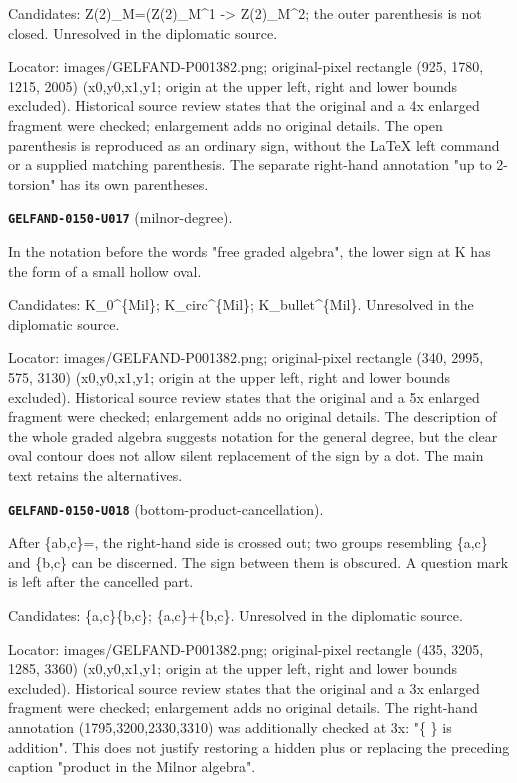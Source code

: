 \documentclass[11pt]{article}
\theoremstyle{definition}
\theoremstyle{remark}
\begin{document}
Candidates: Z(2)\_M=(Z(2)\_M\textasciicircum{}1 -> Z(2)\_M\textasciicircum{}2; the outer parenthesis is not closed. Unresolved in the diplomatic source.\par
Locator: images/GELFAND-P001382.png; original-pixel rectangle (925, 1780, 1215, 2005) (x0,y0,x1,y1; origin at the upper left, right and lower bounds excluded). Historical source review states that the original and a 4x enlarged fragment were checked; enlargement adds no original details. The open parenthesis is reproduced as an ordinary sign, without the LaTeX left command or a supplied matching parenthesis. The separate right-hand annotation "up to 2-torsion" has its own parentheses.\par\medskip
\noindent\leavevmode{}\label{GELFAND-P001382:milnor-degree:note}\textbf{\texttt{GELFAND-0150-U017}} (milnor-degree).\par\nopagebreak[4]
In the notation before the words "free graded algebra", the lower sign at K has the form of a small hollow oval.\par
Candidates: K\_0\textasciicircum{}\{Mil\}; K\_circ\textasciicircum{}\{Mil\}; K\_bullet\textasciicircum{}\{Mil\}. Unresolved in the diplomatic source.\par
Locator: images/GELFAND-P001382.png; original-pixel rectangle (340, 2995, 575, 3130) (x0,y0,x1,y1; origin at the upper left, right and lower bounds excluded). Historical source review states that the original and a 5x enlarged fragment were checked; enlargement adds no original details. The description of the whole graded algebra suggests notation for the general degree, but the clear oval contour does not allow silent replacement of the sign by a dot. The main text retains the alternatives.\par\medskip
\noindent\leavevmode{}\label{GELFAND-P001382:bottom-product-cancellation:note}\textbf{\texttt{GELFAND-0150-U018}} (bottom-product-cancellation).\par\nopagebreak[4]
After \{ab,c\}=, the right-hand side is crossed out; two groups resembling \{a,c\} and \{b,c\} can be discerned. The sign between them is obscured. A question mark is left after the cancelled part.\par
Candidates: \{a,c\}\{b,c\}; \{a,c\}+\{b,c\}. Unresolved in the diplomatic source.\par
Locator: images/GELFAND-P001382.png; original-pixel rectangle (435, 3205, 1285, 3360) (x0,y0,x1,y1; origin at the upper left, right and lower bounds excluded). Historical source review states that the original and a 3x enlarged fragment were checked; enlargement adds no original details. The right-hand annotation (1795,3200,2330,3310) was additionally checked at 3x: "\{ \} is addition". This does not justify restoring a hidden plus or replacing the preceding caption "product in the Milnor algebra".\par\medskip
\end{document}
